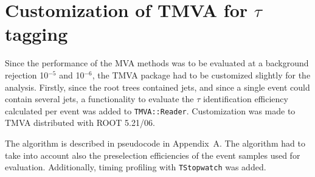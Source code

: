 \documentclass[a4paper]{jpconf}
\begin{document}






 

\section{Customization of TMVA for $\tau$ tagging}\label{sec:customization}
Since the performance of the MVA methods was to be evaluated at a
background rejection 10$^{-5}$ and 10$^{-6}$, the TMVA package had to
be customized slightly for the analysis.
Firstly, since the root trees contained jets, and since a single event
could contain several jets, a functionality to evaluate the $\tau$
identification efficiency calculated per event was added to  {\tt TMVA::Reader}.  
Customization was made to TMVA distributed with ROOT 5.21/06.


The algorithm is described in pseudocode in
Appendix~A. %
The algorithm had to take into account also the preselection
efficiencies of the event samples used for evaluation. Additionally,
timing profiling with {\tt TStopwatch} was added.
\end{document}
